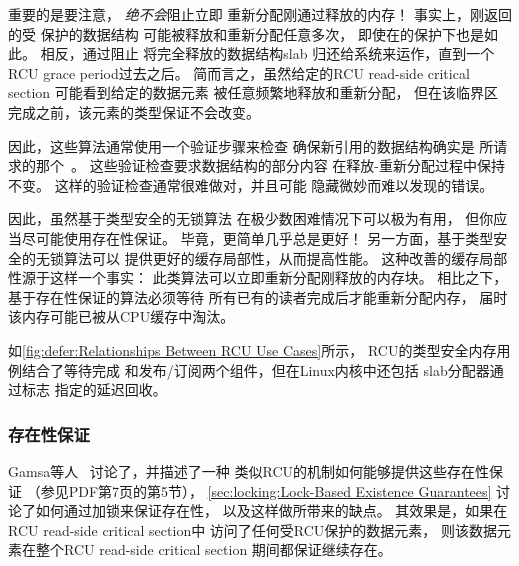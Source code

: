 重要的是要注意，
\emph{绝不会}阻止立即
重新分配刚通过释放的内存！
事实上，刚返回的受
保护的数据结构
可能被释放和重新分配任意多次，
即使在的保护下也是如此。
相反，通过阻止
将完全释放的数据结构slab
归还给系统来运作，直到一个RCU grace period过去之后。
简而言之，虽然给定的RCU read-side critical section
可能看到给定的数据元素
被任意频繁地释放和重新分配，
但在该临界区完成之前，该元素的类型保证不会改变。

因此，这些算法通常使用一个验证步骤来检查
确保新引用的数据结构确实是
所请求的那个~\cite[Section~2.5]{LaninShasha1986TSM}。
这些验证检查要求数据结构的部分内容
在释放-重新分配过程中保持不变。
这样的验证检查通常很难做对，并且可能
隐藏微妙而难以发现的错误。

因此，虽然基于类型安全的无锁算法
在极少数困难情况下可以极为有用，
但你应当尽可能使用存在性保证。
毕竟，更简单几乎总是更好！
另一方面，基于类型安全的无锁算法可以
提供更好的缓存局部性，从而提高性能。
这种改善的缓存局部性源于这样一个事实：
此类算法可以立即重新分配刚释放的内存块。
相比之下，基于存在性保证的算法必须等待
所有已有的读者完成后才能重新分配内存，
届时该内存可能已被从CPU缓存中淘汰。

如\cref{fig:defer:Relationships Between RCU Use Cases}所示，
RCU的类型安全内存用例结合了等待完成
和发布/订阅两个组件，但在Linux内核中还包括
slab分配器通过标志
指定的延迟回收。

\subsubsection{存在性保证}
\label{sec:defer:Existence Guarantee}

Gamsa等人~\cite{Gamsa99}
讨论了，并描述了一种
类似RCU的机制如何能够提供这些存在性保证
（参见PDF第7页的第5节），
\cref{sec:locking:Lock-Based Existence Guarantees}
讨论了如何通过加锁来保证存在性，
以及这样做所带来的缺点。
其效果是，如果在RCU read-side critical section中
访问了任何受RCU保护的数据元素，
则该数据元素在整个RCU read-side critical section
期间都保证继续存在。

